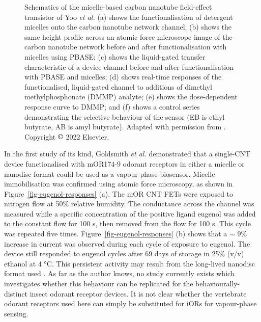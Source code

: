 \documentclass[
  a4paper,
]{scrbook}
\begin{document}
\begin{figure}
\caption[Schematics of the micelle-based carbon nanotube field-effect
transistor of Yoo \emph{et al.}]{\label{fig-yoo-micelle}Schematics of
the micelle-based carbon nanotube field-effect transistor of Yoo
\emph{et al.} (a) shows the functionalisation of detergent micelles onto
the carbon nanotube network channel; (b) shows the same height profile
across an atomic force microscope image of the carbon nanotube network
before and after functionalisation with micelles using PBASE; (c) shows
the liquid-gated transfer characteristic of a device channel before and
after functionalisation with PBASE and micelles; (d) shows real-time
responses of the functionalised, liquid-gated channel to additions of
dimethyl methylphosphonate (DMMP) analyte; (e) shows the dose-dependent
response curve to DMMP; and (f) shows a control series demonstrating the
selective behaviour of the sensor (EB is ethyl butyrate, AB is amyl
butyrate). Adapted with permission from \autocite{Yoo2022}. Copyright
\(\copyright\) 2022 Elsevier.}

\end{figure}

In the first study of its kind, Goldsmith \emph{et al.} demonstrated
that a single-CNT device functionalised with mOR174-9 odorant receptors
in either a micelle or nanodisc format could be used as a vapour-phase
biosensor. Micelle immobilisation was confirmed using atomic force
microscopy, as shown in Figure~\ref{fig-eugenol-responses} (a). The mOR
CNT FETs were exposed to nitrogen flow at 50\% relative humidity. The
conductance across the channel was measured while a specific
concentration of the positive ligand eugenol was added to the constant
flow for 100 s, then removed from the flow for 100 s. This cycle was
repeated five times. Figure~\ref{fig-eugenol-responses} (b) shows that a
\(\sim\) 9\% increase in current was observed during each cycle of
exposure to eugenol. The device still responded to eugenol cycles after
69 days of storage in 25\% (v/v) ethanol at 4 °C. This persistent
activity may result from the long-lived nanodisc format used
\autocite{Goldsmith2011}. As far as the author knows, no study currently
exists which investigates whether this behaviour can be replicated for
the behaviourally-distinct insect odorant receptor devices. It is not
clear whether the vertebrate odorant receptors used here can simply be
substituted for iORs for vapour-phase sensing.
\end{document}
